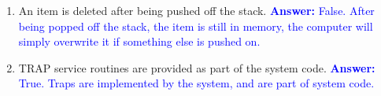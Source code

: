\documentclass{article}
\begin{document}
\begin{enumerate}[label=(\alph*)]
\begin{enumerate}[label=\roman*.]
        \newline
        \newline
        \item An item is deleted after being pushed off the stack.
        \newline
        \newline
        \textcolor{blue}{\textbf{Answer: } False. After being popped off the stack, the item is still in memory, the computer will simply overwrite it if something else is pushed on. }
        \newline
        \newline
        \item TRAP service routines are provided as part of the system code.
        \newline \newline
        \textcolor{blue}{\textbf{Answer: }True. Traps are implemented by the system, and are part of system code. }
        \newline
        \newline
    \end{enumerate}
\end{enumerate}
\end{document}
